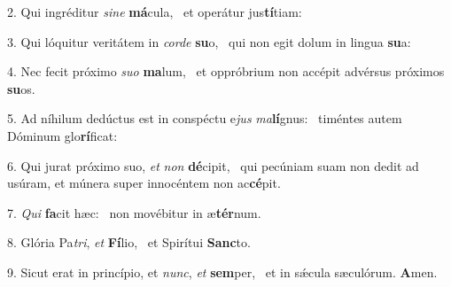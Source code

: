2. Qui ingréditur \textit{si}\textit{ne} \textbf{má}cula, \ast\  et operátur jus\textbf{tí}tiam:\

3. Qui lóquitur veritátem in \textit{cor}\textit{de} \textbf{su}o, \ast\  qui non egit dolum in lingua \textbf{su}a:\

4. Nec fecit próximo \textit{su}\textit{o} \textbf{ma}lum, \ast\  et oppróbrium non accépit advérsus próximos \textbf{su}os.\

5. Ad níhilum dedúctus est in conspéctu e\textit{jus} \textit{ma}\textbf{lí}gnus: \ast\  timéntes autem Dóminum glo\textbf{rí}ficat:\

6. Qui jurat próximo suo, \textit{et} \textit{non} \textbf{dé}cipit, \ast\  qui pecúniam suam non dedit ad usúram, et múnera super innocéntem non ac\textbf{cé}pit.\

7. \textit{Qui} \textbf{fa}cit hæc: \ast\  non movébitur in æ\textbf{tér}num.\

8. Glória Pa\textit{tri}, \textit{et} \textbf{Fí}lio, \ast\  et Spirítui \textbf{Sanc}to.\

9. Sicut erat in princípio, et \textit{nunc}, \textit{et} \textbf{sem}per, \ast\  et in sǽcula sæculórum. \textbf{A}men.\

